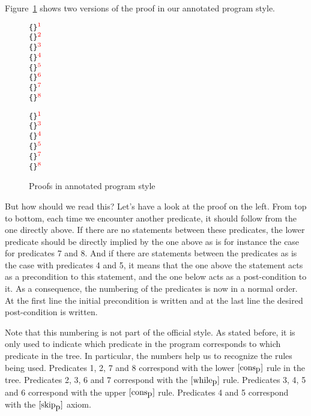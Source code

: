 \documentclass[10pt]{article}
\renewcommand{\allttsup}[1]{\begin{math}^{\textcolor{red}{#1}}\end{math}}
\begin{document}
Figure~\ref{fig:annostyle} shows two versions of the proof in our annotated
program style.

\begin{figure}[htb]
\begin{center}
\begin{multicols}{2}
\begin{varwidth}{3cm}
\begin{alltt}
\{\mtrue\}\allttsup{1}
\{\mtrue\}\allttsup{2}
\mwhile \mtrue
\mdo
  \{\mtrue \allttmath{\land} \mtrue\}\allttsup{3}
  \{\mtrue\}\allttsup{4}
  \mmskip
  \{\mtrue\}\allttsup{5}
  \{\mtrue\}\allttsup{6}
\{\allttmath{\neg}\mtrue \allttmath{\land} \mtrue\}\allttsup{7}
\{\mfalse\}\allttsup{8}
\end{alltt}
\end{varwidth}
\newpage
\begin{varwidth}{3cm}
\begin{alltt}
\{\mtrue\}\allttsup{1}
\mwhile \mtrue
\mdo
  \{\mtrue \allttmath{\land} \mtrue\}\allttsup{3}
  \{\mtrue\}\allttsup{4}
  \mmskip
  \{\mtrue\}\allttsup{5}
\{\allttmath{\neg}\mtrue \allttmath{\land} \mtrue\}\allttsup{7}
\{\mfalse\}\allttsup{8}
\end{alltt}
\end{varwidth}
\end{multicols}
\end{center}
\caption{Proofs in annotated program style}
\label{fig:annostyle}
\end{figure}

But how should we read this?
Let's have a look at the proof on the left.
From top to bottom, each time we encounter another predicate, it should
follow from the one directly above.
If there are no statements between these predicates, the lower
predicate should be directly implied by the one above as is for instance the
case for predicates 7 and 8.
And if there are statements between the predicates
as is the case with predicates 4 and 5, it means that
the one above the statement
acts as a precondition to this statement, and the one below
acts as a post-condition to it.
As a consequence, the numbering of the predicates is now in a normal
order. At the first line the initial precondition is written and at the last
line the desired post-condition is written.

Note that this numbering is not part of the official style.
As stated before, it is only used to indicate which predicate in the program
corresponds to which predicate in the tree.
In particular, the numbers help us to recognize the rules being used.
Predicates 1, 2, 7 and 8 correspond with the lower $[\mbox{cons}_{\mbox{p}}]$ rule in the tree.
Predicates 2, 3, 6 and 7 correspond with the $[\mbox{while}_{\mbox{p}}]$ rule.
Predicates 3, 4, 5 and 6 correspond with the upper $[\mbox{cons}_{\mbox{p}}]$ rule.
Predicates 4 and 5 correspond with the $[\mbox{skip}_{\mbox{p}}]$ axiom.
\end{document}
